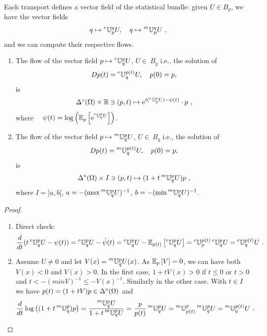 \documentclass[12pt,a4paper]{amsart}
\begin{document}
Each transport defines a vector field of the statistical bundle: given $U \in B_p$, we have the vector fields
%
\begin{equation*}
  q \mapsto \prescript{e}{}{\mathbb U}_{p}^{q} U, \quad q \mapsto \prescript{m}{}{\mathbb U}_{p}^{q} U \ ,
\end{equation*}
%
%
and we can compute their respective flows. 

%
\begin{proposition}
  \begin{enumerate}
  \item The flow of the vector field $p \mapsto \prescript{e}{}{\mathbb U}_{q}^{p} U$, $U \in \ B_q$ i.e., the solution of 
%
    \begin{equation*}
      Dp(t) = \prescript{e}{}{\mathbb U}_{q}^{p(t)} U, \quad p(0) = p,
    \end{equation*}
%
 is 
%
 \begin{equation*}
  \Delta^\circ(\Omega) \times \mathbb R \ni (p,t) \mapsto \mathrm{e}^{t(\prescript{e}{}{\mathbb U}_{q}^{p} U) - \psi(t)} \cdot p \ ,
 \end{equation*}
%
where $\quad \psi(t) = \log\left( {\operatorname{\mathbb E}}_{p}\left[\mathrm{e}^{\prescript{e}{}{\mathbb U}_{q}^{p} U}\right] \right)$.
%
\item The flow of the vector field $p \mapsto \prescript{m}{}{\mathbb U}_{q}^{p} U$, $U \in \ B_q$ i.e., the solution of 
%
    \begin{equation*}
      Dp(t) = \prescript{m}{}{\mathbb U}_{q}^{p(t)} U, \quad p(0) = p,
    \end{equation*}
%
 is 
%
 \begin{equation*}
  \Delta^\circ(\Omega) \times I \ni (p,t) \mapsto (1+t\prescript{m}{}{\mathbb U}_{q}^{p} U)p \ ,
 \end{equation*}
%
where $I = ]a,b[$, $a = - (\max \prescript{m}{}{\mathbb U}_{q}^{p} U)^{-1}$, $b = - (\min \prescript{m}{}{\mathbb U}_{q}^{p} U)^{-1}$.
\end{enumerate}
\end{proposition}

\begin{proof}
  \begin{enumerate}
  \item Direct check:
%
    \begin{equation*}
      \frac{d}{dt} (t\prescript{e}{}{\mathbb U}_{q}^{p} U - \psi(t))  = \prescript{e}{}{\mathbb U}_{q}^{p} U - \dot \psi(t) = \prescript{e}{}{\mathbb U}_{q}^{p} U - {\operatorname{\mathbb E}}_{p(t)}\left[\prescript{e}{}{\mathbb U}_{q}^{p} U\right] = \prescript{e}{}{\mathbb U}_{p}^{p(t)} \prescript{e}{}{\mathbb U}_{q}^{p} U =  \prescript{e}{}{\mathbb U}_{q}^{p(t)} U \ . 
    \end{equation*}
%
  \item Assume $U \ne 0$ and let $V(x) = \prescript{m}{}{\mathbb U}_{q}^{p} U(x)$. As ${\operatorname{\mathbb E}}_{p}\left[V\right] = 0$, we can have both $V(x) < 0$ and $V(x) > 0$. In the first case, $1 + tV(x) > 0$ if $t \le 0$ or $t>0$ and $t < -(min V)^{-1} \le -V(x)^{-1}$. Similarly in the other case. With $t \in I$ we have $p(t) = (1+tV)p \in \Delta^\circ(\Omega)$ and
%
    \begin{equation*}
      \frac{d}{dt} \log\left( (1+t\prescript{m}{}{\mathbb U}_{q}^{p})p \right) = \frac{\prescript{m}{}{\mathbb U}_{q}^{p} U}{1+t\prescript{m}{}{\mathbb U}_{q}^{p} U} = \frac p {p(t)} \prescript{m}{}{\mathbb U}_{q}^{p} U = \prescript{m}{}{\mathbb U}_{p(t)}^{p} \prescript{m}{}{\mathbb U}_{q}^{p} U = \prescript{m}{}{\mathbb U}_{q}^{p(t)} U \ .
    \end{equation*}
  \end{enumerate}
\end{proof}
\end{document}
